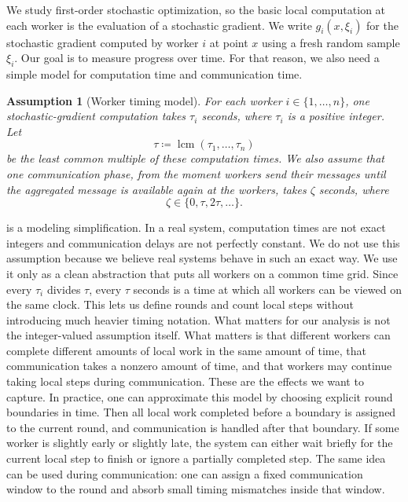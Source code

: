\documentclass{article}
\newcommand{\eqdef}{\coloneqq}
\theoremstyle{plain}
\newtheorem{assumption}{Assumption}\numberwithin{assumption}{section}
\theoremstyle{definition}
\begin{document}
We study first-order stochastic optimization, so the basic local computation at each worker is the evaluation of a stochastic gradient.
We write \(g_i(x,\xi_i)\) for the stochastic gradient computed by worker \(i\) at point \(x\) using a fresh random sample \(\xi_i\).
Our goal is to measure progress over time.
For that reason, we also need a simple model for computation time and communication time.
\begin{assumption}[Worker timing model]\label{ass:worker_times}
    For each worker \(i \in \{1,\dots,n\}\), one stochastic-gradient computation takes \(\tau_i\) seconds, where \(\tau_i\) is a positive integer.
    Let
    \[%
        \tau \eqdef \operatorname{lcm}(\tau_1,\dots,\tau_n)
    \]
    be the least common multiple of these computation times.
    We also assume that one communication phase, from the moment workers send their messages until the aggregated message is available again at the workers, takes \(\zeta\) seconds, where
    \[%
        \zeta \in \{0,\tau,2\tau,\dots\}.
    \]
\end{assumption}
% 
 is a modeling simplification.
In a real system, computation times are not exact integers and communication delays are not perfectly constant.
We do not use this assumption because we believe real systems behave in such an exact way.
We use it only as a clean abstraction that puts all workers on a common time grid.
Since every \(\tau_i\) divides \(\tau\), every \(\tau\) seconds is a time at which all workers can be viewed on the same clock.
This lets us define rounds and count local steps without introducing much heavier timing notation.
What matters for our analysis is not the integer-valued assumption itself.
What matters is that different workers can complete different amounts of local work in the same amount of time, that communication takes a nonzero amount of time, and that workers may continue taking local steps during communication.
These are the effects we want to capture.
In practice, one can approximate this model by choosing explicit round boundaries in time.
Then all local work completed before a boundary is assigned to the current round, and communication is handled after that boundary.
If some worker is slightly early or slightly late, the system can either wait briefly for the current local step to finish or ignore a partially completed step.
The same idea can be used during communication: one can assign a fixed communication window to the round and absorb small timing mismatches inside that window.
\end{document}
